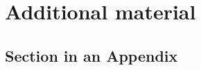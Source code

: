 \chapter{Additional material}
\label{apdx::a}

\section{Section in an Appendix}
\lipsum[1-6]

\cleardoublepage
